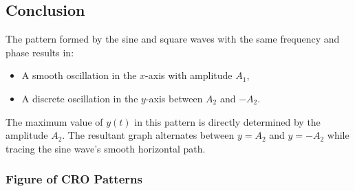\documentclass[12pt,a4paper]{report}
\begin{document}
\subsection*{Conclusion}
The pattern formed by the sine and square waves with the same frequency and phase results in:
\begin{itemize}
    \item A smooth oscillation in the \( x \)-axis with amplitude \( A_1 \),
    \item A discrete oscillation in the \( y \)-axis between \( A_2 \) and \( -A_2 \).
\end{itemize}
The maximum value of \( y(t) \) in this pattern is directly determined by the amplitude \( A_2 \). The resultant graph alternates between \( y = A_2 \) and \( y = -A_2 \) while tracing the sine wave's smooth horizontal path.
\subsubsection*{Figure of CRO Patterns}
\end{document}
